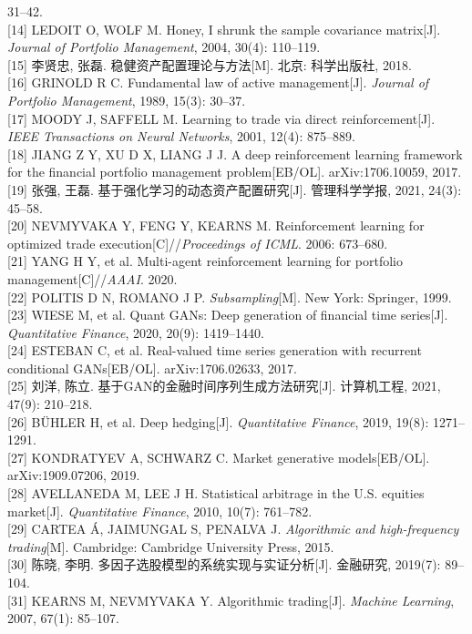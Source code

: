 \documentclass[UTF8]{ctexart}
\begin{document}
\begin{enumerate}
  31--42.\\
  {[}14{]} LEDOIT O, WOLF M. Honey, I shrunk the sample covariance
  matrix{[}J{]}. \emph{Journal of Portfolio Management}, 2004, 30(4):
  110--119.\\
  {[}15{]} 李贤忠, 张磊. 稳健资产配置理论与方法{[}M{]}. 北京:
  科学出版社, 2018.\\
  {[}16{]} GRINOLD R C. Fundamental law of active management{[}J{]}.
  \emph{Journal of Portfolio Management}, 1989, 15(3): 30--37.\\
  {[}17{]} MOODY J, SAFFELL M. Learning to trade via direct
  reinforcement{[}J{]}. \emph{IEEE Transactions on Neural Networks},
  2001, 12(4): 875--889.\\
  {[}18{]} JIANG Z Y, XU D X, LIANG J J. A deep reinforcement learning
  framework for the financial portfolio management problem{[}EB/OL{]}.
  arXiv:1706.10059, 2017.\\
  {[}19{]} 张强, 王磊. 基于强化学习的动态资产配置研究{[}J{]}.
  管理科学学报, 2021, 24(3): 45--58.\\
  {[}20{]} NEVMYVAKA Y, FENG Y, KEARNS M. Reinforcement learning for
  optimized trade execution{[}C{]}//\emph{Proceedings of ICML}. 2006:
  673--680.\\
  {[}21{]} YANG H Y, et al. Multi-agent reinforcement learning for
  portfolio management{[}C{]}//\emph{AAAI}. 2020.\\
  {[}22{]} POLITIS D N, ROMANO J P. \emph{Subsampling}{[}M{]}. New York:
  Springer, 1999.\\
  {[}23{]} WIESE M, et al. Quant GANs: Deep generation of financial time
  series{[}J{]}. \emph{Quantitative Finance}, 2020, 20(9): 1419--1440.\\
  {[}24{]} ESTEBAN C, et al. Real-valued time series generation with
  recurrent conditional GANs{[}EB/OL{]}. arXiv:1706.02633, 2017.\\
  {[}25{]} 刘洋, 陈立. 基于GAN的金融时间序列生成方法研究{[}J{]}.
  计算机工程, 2021, 47(9): 210--218.\\
  {[}26{]} BÜHLER H, et al. Deep hedging{[}J{]}. \emph{Quantitative
  Finance}, 2019, 19(8): 1271--1291.\\
  {[}27{]} KONDRATYEV A, SCHWARZ C. Market generative models{[}EB/OL{]}.
  arXiv:1909.07206, 2019.\\
  {[}28{]} AVELLANEDA M, LEE J H. Statistical arbitrage in the U.S.
  equities market{[}J{]}. \emph{Quantitative Finance}, 2010, 10(7):
  761--782.\\
  {[}29{]} CARTEA Á, JAIMUNGAL S, PENALVA J. \emph{Algorithmic and
  high-frequency trading}{[}M{]}. Cambridge: Cambridge University Press,
  2015.\\
  {[}30{]} 陈晓, 李明. 多因子选股模型的系统实现与实证分析{[}J{]}.
  金融研究, 2019(7): 89--104.\\
  {[}31{]} KEARNS M, NEVMYVAKA Y. Algorithmic trading{[}J{]}.
  \emph{Machine Learning}, 2007, 67(1): 85--107.


\end{enumerate}
\end{document}
